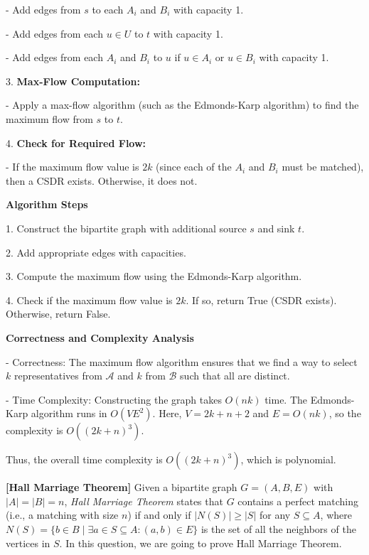\documentclass{oxmathproblems}
\begin{document}
\begin{questions}
   - Add edges from \( s \) to each \( A_i \) and \( B_i \) with capacity 1.
   
   - Add edges from each \( u \in U \) to \( t \) with capacity 1.

   - Add edges from each \( A_i \) and \( B_i \) to \( u \) if \( u \in A_i \) or \( u \in B_i \) with capacity 1.

3. \textbf{Max-Flow Computation:}

   - Apply a max-flow algorithm (such as the Edmonds-Karp algorithm) to find the maximum flow from \( s \) to \( t \).

4. \textbf{Check for Required Flow:}

   - If the maximum flow value is \( 2k \) (since each of the \( A_i \) and \( B_i \) must be matched), then a CSDR exists. Otherwise, it does not.

\textbf{Algorithm Steps}

1. Construct the bipartite graph with additional source \( s \) and sink \( t \).

2. Add appropriate edges with capacities.

3. Compute the maximum flow using the Edmonds-Karp algorithm.

4. Check if the maximum flow value is \( 2k \). If so, return True (CSDR exists). Otherwise, return False.

\textbf{Correctness and Complexity Analysis}

- Correctness: The maximum flow algorithm ensures that we find a way to select \( k \) representatives from \(\mathcal{A}\) and \( k \) from \(\mathcal{B}\) such that all are distinct.

- Time Complexity: Constructing the graph takes \( O(nk) \) time. The Edmonds-Karp algorithm runs in \( O(VE^2) \). Here, \( V = 2k + n + 2 \) and \( E = O(nk) \), so the complexity is \( O((2k + n)^3) \).

Thus, the overall time complexity is \( O((2k + n)^3) \), which is polynomial.

\miquestion[25] \textbf{[Hall Marriage Theorem]}
Given a bipartite graph $G=(A,B,E)$ with $|A|=|B|=n$, \emph{Hall Marriage Theorem} states that $G$ contains a perfect matching (i.e., a matching with size $n$) if and only if $|N(S)|\geq |S|$ for any $S\subseteq A$, where $N(S)=\{b\in B\mid \exists a\in S\subseteq A: (a,b)\in E\}$ is the set of all the neighbors of the vertices in $S$.
In this question, we are going to prove Hall Marriage Theorem.
\end{questions}
\end{document}
